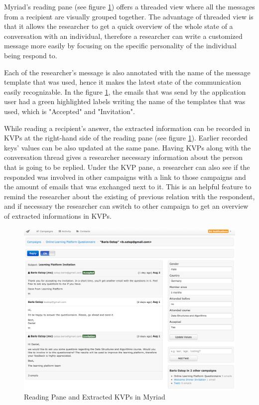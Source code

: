 Myriad's reading pane (see figure \ref{fig:MyriadReadingPane}) offers a threaded view where all the messages from a recipient are visually grouped together. The advantage of threaded view is that it allows the researcher to get a quick overview of the whole state of a conversation with an individual, therefore a researcher can write a customized message more easily by focusing on the specific personality of the individual being respond to.
\vspace{1cm}

Each of the researcher's message is also annotated with the name of the message template that was used, hence it makes the latest state of the communication easily recognizable. In the figure \ref{fig:MyriadReadingPane}, the emails that was send by the application user had a green highlighted labels writing the name of the templates that was used, which is "Accepted" and "Invitation".
\vspace{1cm}

While reading a recipient's answer, the extracted information can be recorded in \ac{KVP}s at the right-hand side of the reading pane (see figure \ref{fig:MyriadReadingPane}). Earlier recorded keys' values can be also updated at the same pane. Having \ac{KVP}s along with the conversation thread gives a researcher necessary information about the person that is going to be replied. Under the \ac{KVP} pane, a researcher can also see if the responded was involved in other campaigns with a link to those campaigns and the amount of emails that was exchanged next to it. This is an helpful feature to remind the researcher about the existing of previous relation with the respondent, and if necessary the researcher can switch to other campaign to get an overview of extracted informations in \ac{KVP}s.

\begin{figure}[htbp]
	\centering
	\includegraphics[width=1.00\textwidth]{imgs/MyriadReadingPane.png}
	\caption[Reading Pane and Extracted \ac{KVP}s in Myriad]{Reading Pane and Extracted \ac{KVP}s in Myriad}
	\label{fig:MyriadReadingPane}
\end{figure}

